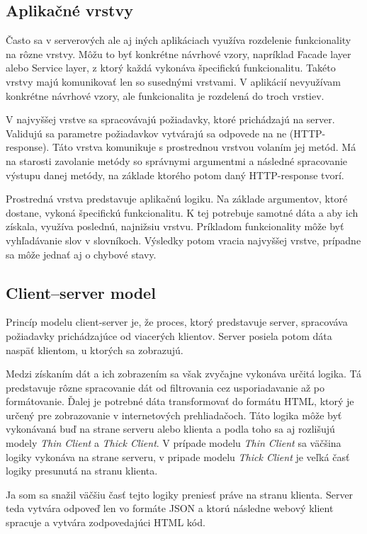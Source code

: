 \documentclass[
  digital, %
  table,   %
  lof,     %
  lot,     %
]{fithesis3}
\begin{document}
\subsection{Aplikačné vrstvy}
Často sa v serverových ale aj iných aplikáciach využíva rozdelenie funkcionality na rôzne vrstvy. Môžu to byť konkrétne návrhové vzory, napríklad Facade layer alebo Service layer, z ktorý každá vykonáva špecifickú funkcionalitu. Takéto vrstvy majú komunikovať len so susednými vrstvami. V aplikácií nevyužívam konkrétne návrhové vzory, ale funkcionalita je rozdelená do troch vrstiev.

V najvyššej vrstve sa spracovávajú požiadavky, ktoré prichádzajú na server. Validujú sa parametre požiadavkov vytvárajú sa odpovede na ne (HTTP-response). Táto vrstva komunikuje s prostrednou vrstvou volaním jej metód. Má na starosti zavolanie metódy so správnymi argumentmi a následné spracovanie výstupu danej metódy, na základe ktorého potom daný HTTP-response tvorí.

Prostredná vrstva predstavuje aplikačnú logiku. Na základe argumentov, ktoré dostane, vykoná špecifickú funkcionalitu. K tej potrebuje samotné dáta a aby ich získala, využíva poslednú, najnižsiu vrstvu. Príkladom funkcionality môže byť vyhľadávanie slov v slovníkoch. Výsledky potom vracia najvyššej vrstve, prípadne sa môže jednať aj o chybové stavy.

\subsection{Client–server model}
Princíp modelu client-server je, že proces, ktorý predstavuje server, spracováva požiadavky prichádzajúce od viacerých klientov. Server posiela potom dáta naspäť klientom, u ktorých sa zobrazujú.

Medzi získaním dát a ich zobrazením sa však zvyčajne vykonáva určitá logika. Tá predstavuje rôzne spracovanie dát od filtrovania cez usporiadavanie až po formátovanie. Ďalej je potrebné dáta transformovať do formátu HTML, ktorý je určený pre zobrazovanie v internetových prehliadačoch. Táto logika môže byť vykonávaná buď na strane serveru alebo klienta a podla toho sa aj rozlišujú modely \textit{Thin Client} a \textit{Thick Client}. V prípade modelu \textit{Thin Client} sa väčšina logiky vykonáva na strane serveru, v pripade modelu \textit{Thick Client} je veľká časť logiky presunutá na stranu klienta.

Ja som sa snažil väčšiu časť tejto logiky preniesť práve na stranu klienta. Server teda vytvára odpoveď len vo formáte JSON a ktorú následne webový klient spracuje a vytvára zodpovedajúci HTML kód. 
\end{document}
